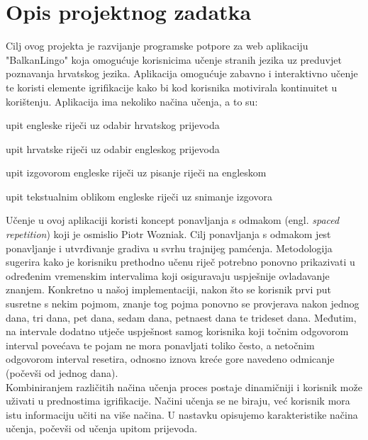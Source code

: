 \chapter{Opis projektnog zadatka}

		Cilj ovog projekta je razvijanje programske potpore za web aplikaciju "BalkanLingo" koja omogućuje korisnicima učenje stranih jezika uz preduvjet poznavanja hrvatskog jezika. Aplikacija omogućuje zabavno i interaktivno učenje te koristi elemente igrifikacije kako bi kod korisnika motivirala kontinuitet u korištenju.
		Aplikacija ima nekoliko načina učenja, a to su: 
		\begin{packed_item}
			\item upit engleske riječi uz odabir hrvatskog prijevoda
			\item upit hrvatske riječi uz odabir engleskog prijevoda
			\item upit izgovorom engleske riječi uz pisanje riječi na engleskom
			\item upit tekstualnim oblikom engleske riječi uz snimanje izgovora
		\end{packed_item}

		Učenje u ovoj aplikaciji koristi  koncept ponavljanja s odmakom (engl. \textit{spaced repetition}) koji je osmislio Piotr Wozniak. Cilj ponavljanja s odmakom jest ponavljanje i utvrđivanje gradiva u svrhu trajnijeg pamćenja. Metodologija sugerira kako je korisniku prethodno učenu riječ potrebno ponovno prikazivati u određenim vremenskim intervalima koji osiguravaju uspješnije ovladavanje znanjem.
		\newline
		\newline
		Konkretno u našoj implementaciji, nakon što se korisnik prvi put susretne s nekim pojmom, znanje tog pojma ponovno se provjerava nakon jednog dana, tri dana, pet dana, sedam dana, petnaest dana te trideset dana. Međutim, na intervale dodatno utječe uspješnost samog korisnika koji točnim odgovorom interval povećava te pojam ne mora ponavljati toliko često, a netočnim odgovorom interval resetira, odnosno iznova kreće gore navedeno odmicanje (počevši od jednog dana). 
		\\
		\noindent Kombiniranjem različitih načina učenja proces postaje dinamičniji i korisnik može uživati u prednostima igrifikacije. Načini učenja se ne biraju, već korisnik mora istu informaciju učiti na više načina. U nastavku opisujemo karakteristike načina učenja, počevši od učenja upitom prijevoda.
		\\

